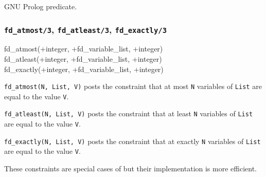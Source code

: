 \Portability

GNU Prolog predicate.

\subsubsection{\texttt{fd\_atmost/3},
               \texttt{fd\_atleast/3},
               \texttt{fd\_exactly/3}}

\begin{TemplatesOneCol}
fd\_atmost(+integer, +fd\_variable\_list, +integer)\\
fd\_atleast(+integer, +fd\_variable\_list, +integer)\\
fd\_exactly(+integer, +fd\_variable\_list, +integer)

\end{TemplatesOneCol}

\Description

\texttt{fd\_atmost(N, List, V)} posts the constraint that at most \texttt{N}
variables of \texttt{List} are equal to the value \texttt{V}.

\texttt{fd\_atleast(N, List, V)} posts the constraint that at least
\texttt{N} variables of \texttt{List} are equal to the value \texttt{V}.

\texttt{fd\_exactly(N, List, V)} posts the constraint that at exactly
\texttt{N} variables of \texttt{List} are equal to the value \texttt{V}.

These constraints are special cases of 
 but their implementation is more efficient.

\begin{PlErrors}








\end{PlErrors}

